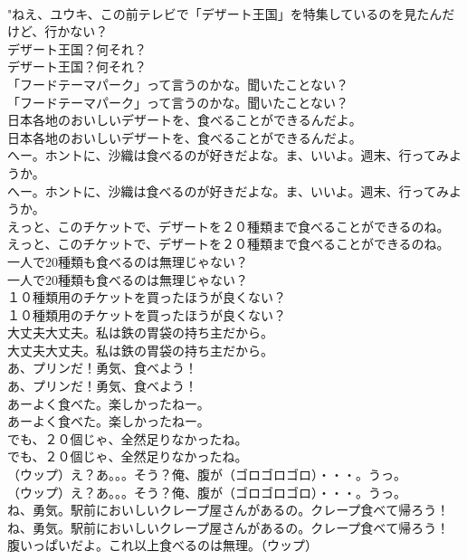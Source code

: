 \documentclass[8pt]{extreport}
\begin{document}
\begin{CJK}{UTF8}{min}
\\	"ねえ、ユウキ、この前テレビで「デザート王国」を特集しているのを見たんだけど、行かない？ 
\\	デザート王国？何それ？	
\\	デザート王国？何それ？ 
\\	「フードテーマパーク」って言うのかな。聞いたことない？	
\\	「フードテーマパーク」って言うのかな。聞いたことない？ 
\\	日本各地のおいしいデザートを、食べることができるんだよ。	
\\	日本各地のおいしいデザートを、食べることができるんだよ。 
\\	へー。ホントに、沙織は食べるのが好きだよな。ま、いいよ。週末、行ってみようか。	
\\	へー。ホントに、沙織は食べるのが好きだよな。ま、いいよ。週末、行ってみようか。 
\\	えっと、このチケットで、デザートを２０種類まで食べることができるのね。	
\\	えっと、このチケットで、デザートを２０種類まで食べることができるのね。 
\\	一人で20種類も食べるのは無理じゃない？	
\\	一人で20種類も食べるのは無理じゃない？ 
\\	１０種類用のチケットを買ったほうが良くない？	
\\	１０種類用のチケットを買ったほうが良くない？ 
\\	大丈夫大丈夫。私は鉄の胃袋の持ち主だから。	
\\	大丈夫大丈夫。私は鉄の胃袋の持ち主だから。 
\\	あ、プリンだ！勇気、食べよう！	
\\	あ、プリンだ！勇気、食べよう！ 
\\	あーよく食べた。楽しかったねー。	
\\	あーよく食べた。楽しかったねー。 
\\	でも、２０個じゃ、全然足りなかったね。	
\\	でも、２０個じゃ、全然足りなかったね。 
\\	（ウップ）え？あ。。。そう？俺、腹が（ゴロゴロゴロ）・・・。うっ。	
\\	（ウップ）え？あ。。。そう？俺、腹が（ゴロゴロゴロ）・・・。うっ。 
\\	ね、勇気。駅前においしいクレープ屋さんがあるの。クレープ食ベて帰ろう！	
\\	ね、勇気。駅前においしいクレープ屋さんがあるの。クレープ食ベて帰ろう！ 
\\	腹いっぱいだよ。これ以上食べるのは無理。（ウップ）	

\end{CJK}
\end{document}
